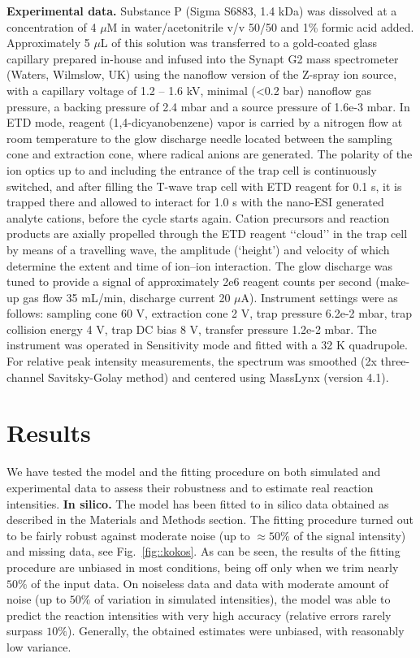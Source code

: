 \documentclass{llncs}
\begin{document}
        \textbf{Experimental data.} Substance P (Sigma S6883, 1.4 kDa) was dissolved at a concentration of 4 $\mu$M in water/acetonitrile v/v 50/50 and 1\% formic acid added. Approximately 5 $\mu$L of this solution was transferred to a gold-coated glass capillary prepared in-house and infused into the Synapt G2 mass spectrometer (Waters, Wilmslow, UK) using the nanoflow version of the Z-spray ion source, with a capillary voltage of 1.2 – 1.6 kV, minimal (<0.2 bar) nanoflow gas pressure, a backing pressure of 2.4 mbar and a source pressure of 1.6e-3 mbar. In ETD mode, reagent (1,4-dicyanobenzene) vapor is carried by a nitrogen flow at room temperature to the glow discharge needle located between the sampling cone and extraction cone, where radical anions are generated. The polarity of the ion optics up to and including the entrance of the trap cell is continuously switched, and after filling the T-wave trap cell with ETD reagent for 0.1 s, it is trapped there and allowed to interact for 1.0 s with the nano-ESI generated analyte cations, before the cycle starts again. Cation precursors and reaction products are axially propelled through the ETD reagent ‘‘cloud’’ in the trap cell by means of a travelling wave, the amplitude (‘height’) and velocity of which determine the extent and time of ion–ion interaction. The glow discharge was tuned to provide a signal of approximately 2e6 reagent counts per second (make-up gas flow 35 mL/min, discharge current 20 $\mu$A). Instrument settings were as follows: sampling cone 60 V, extraction cone 2 V, trap pressure 6.2e-2 mbar, trap collision energy 4 V, trap DC bias 8 V, transfer pressure 1.2e-2 mbar. The instrument was operated in Sensitivity mode and fitted with a 32 K quadrupole. For relative peak intensity measurements, the spectrum was smoothed (2x three-channel Savitsky-Golay method) and centered using MassLynx (version 4.1).
%
        \section{Results}
        We have tested the model and the fitting procedure on both simulated and experimental data to assess their robustness and to estimate real reaction intensities.
%
        \textbf{In silico.} The model has been fitted to in silico data obtained as described in the Materials and Methods section. The fitting procedure turned out to be fairly robust against moderate noise (up to $ \approx 50\%$ of the signal intensity) and missing data, see Fig.~\ref{fig::kokos}. As can be seen, the results of the fitting procedure are unbiased in most conditions, being off only when we trim nearly $50\%$ of the input data. On noiseless data and data with moderate amount of noise (up to $50\%$ of variation in simulated intensities), the model was able to predict the reaction intensities with very high accuracy (relative errors rarely surpass $10\%$). Generally, the obtained estimates were unbiased, with reasonably low variance.
\end{document}
